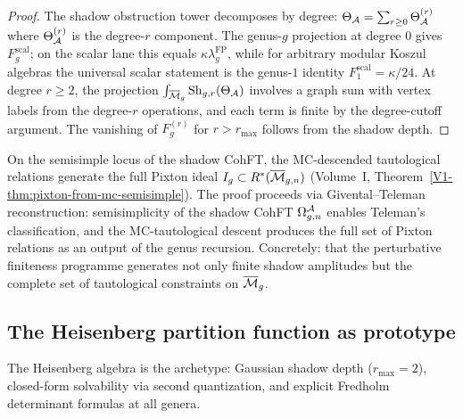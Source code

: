 \begin{proof}
The shadow obstruction tower decomposes by degree:
$\Theta_{\mathcal{A}} = \sum_{r \geq 0} \Theta_{\mathcal{A}}^{(r)}$ where
$\Theta_{\mathcal{A}}^{(r)}$ is the degree-$r$ component. The genus-$g$
projection at degree $0$ gives $F_g^{\mathrm{scal}}$; on the
scalar lane this equals
$\kappa\lambda_g^{\mathrm{FP}}$, while for arbitrary modular Koszul
algebras the universal scalar statement is the genus-$1$ identity
$F_1^{\mathrm{scal}}=\kappa/24$. At degree $r \geq 2$, the projection
$\int_{\overline{\mathcal{M}}_g} \operatorname{Sh}_{g,r}(\Theta_{\mathcal{A}})$
involves a graph sum with vertex labels from the degree-$r$ operations,
and each term is finite by the degree-cutoff argument. The vanishing of
$F_g^{(r)}$ for $r > r_{\max}$ follows from the shadow depth.
\end{proof}

\begin{remark}
\label{rem:vol2-pixton-from-mc}
On the semisimple locus of the shadow CohFT, the MC-descended
tautological relations generate the full Pixton ideal
$I_g \subset R^*(\overline{\mathcal{M}}_{g,n})$
\textup{(}Volume~I, Theorem~\textup{\ref*{V1-thm:pixton-from-mc-semisimple})}.
The proof proceeds via Givental--Teleman reconstruction: semisimplicity
of the shadow CohFT $\Omega^{\mathcal{A}}_{g,n}$ enables Teleman's classification,
and the MC-tautological descent produces the full set of Pixton relations
as an output of the genus recursion. Concretely:
that the perturbative finiteness programme generates not only finite
shadow amplitudes but the complete set of tautological constraints on
$\overline{\mathcal{M}}_g$.
\end{remark}


\subsection{The Heisenberg partition function as prototype}
\label{subsec:thqg-I-heisenberg-prototype}

The Heisenberg algebra is the archetype: Gaussian shadow depth ($r_{\max} = 2$), closed-form solvability via second quantization, and explicit Fredholm determinant formulas at all genera.

